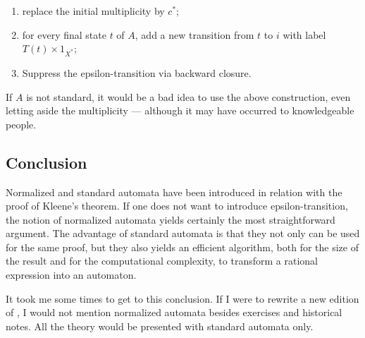 \begin{enumerate}
\item replace the initial multiplicity by $c^*$;

\item for every final state $t$ of $A$, add a new transition from $t$
  to $i$ with label $T(t) \times 1_{X^*}$;

\item Suppress the epsilon-transition via backward closure.
\end{enumerate}
\begin{remark}
  If $A$ is not standard, it would be a bad idea to use the above
  construction, even letting aside the multiplicity --- although it
  may have occurred to knowledgeable people.
\end{remark}

\subsection{Conclusion}

Normalized and standard automata have been introduced in relation with
the proof of Kleene's theorem. If one does not want to introduce
epsilon-transition, the notion of normalized automata yields certainly
the most straightforward argument. The advantage of standard automata
is that they not only can be used for the same proof, but they also
yields an efficient algorithm, both for the size of the result and for
the computational complexity, to transform a rational expression into
an automaton.

It took me some times to get to this conclusion. If I were to rewrite
a new edition of \cite{sakarovitch.03.eta}, I would not mention
normalized automata besides exercises and historical notes. All the
theory would be presented with standard automata only.


